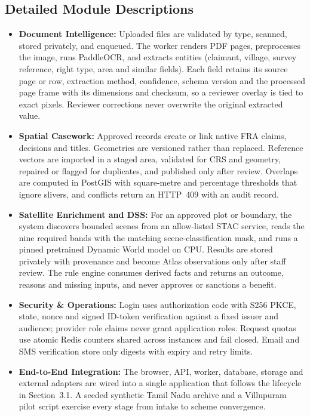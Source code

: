 \documentclass[11pt, a4paper]{article}
\begin{document}
\subsection{Detailed Module Descriptions}
\begin{itemize}[noitemsep, topsep=2pt]
    \item \textbf{Document Intelligence:} Uploaded files are validated by type, scanned, stored privately, and enqueued. The worker renders PDF pages, preprocesses the image, runs PaddleOCR, and extracts entities (claimant, village, survey reference, right type, area and similar fields). Each field retains its source page or row, extraction method, confidence, schema version and the processed page frame with its dimensions and checksum, so a reviewer overlay is tied to exact pixels. Reviewer corrections never overwrite the original extracted value.
    \item \textbf{Spatial Casework:} Approved records create or link native FRA claims, decisions and titles. Geometries are versioned rather than replaced. Reference vectors are imported in a staged area, validated for CRS and geometry, repaired or flagged for duplicates, and published only after review. Overlaps are computed in PostGIS with square-metre and percentage thresholds that ignore slivers, and conflicts return an HTTP~409 with an audit record.
    \item \textbf{Satellite Enrichment and DSS:} For an approved plot or boundary, the system discovers bounded scenes from an allow-listed STAC service, reads the nine required bands with the matching scene-classification mask, and runs a pinned pretrained Dynamic World model on CPU. Results are stored privately with provenance and become Atlas observations only after staff review. The rule engine consumes derived facts and returns an outcome, reasons and missing inputs, and never approves or sanctions a benefit.
    \item \textbf{Security \& Operations:} Login uses authorization code with S256 PKCE, state, nonce and signed ID-token verification against a fixed issuer and audience; provider role claims never grant application roles. Request quotas use atomic Redis counters shared across instances and fail closed. Email and SMS verification store only digests with expiry and retry limits.
    \item \textbf{End-to-End Integration:} The browser, API, worker, database, storage and external adapters are wired into a single application that follows the lifecycle in Section~3.1. A seeded synthetic Tamil Nadu archive and a Villupuram pilot script exercise every stage from intake to scheme convergence.
\end{itemize}
\end{document}
